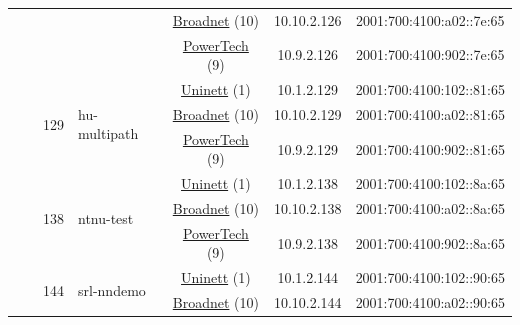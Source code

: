 \begin{small}
\begin{center}
\begin{longtable}{|c|c|c|c|c|c|c|c|}
  &  &  &  & \multicolumn{2}{|c|}{\tiny{\href{https://www.broadnet.no}{Broadnet} (10)}} & \tiny{10.10.2.126} & \tiny{2001:700:4100:a02::7e:65} \\* \cline{5-5}\cline{6-6}\cline{7-7}\cline{8-8}
  &  &  &  & \multicolumn{2}{|c|}{\tiny{\href{http://www.powertech.no}{PowerTech} (9)}} & \tiny{10.9.2.126} & \tiny{2001:700:4100:902::7e:65} \\* \cline{3-3}\cline{4-4}\cline{5-5}\cline{6-6}\cline{7-7}\cline{8-8}
  &  & \multirow{3}{*}{\tiny{129}} & \multicolumn{1}{|l|}{\multirow{3}{*}{\tiny{hu-multipath}}} & \multicolumn{2}{|c|}{\tiny{\href{https://www.uninett.no}{Uninett} (1)}} & \tiny{10.1.2.129} & \tiny{2001:700:4100:102::81:65} \\* \cline{5-5}\cline{6-6}\cline{7-7}\cline{8-8}
  &  &  &  & \multicolumn{2}{|c|}{\tiny{\href{https://www.broadnet.no}{Broadnet} (10)}} & \tiny{10.10.2.129} & \tiny{2001:700:4100:a02::81:65} \\* \cline{5-5}\cline{6-6}\cline{7-7}\cline{8-8}
  &  &  &  & \multicolumn{2}{|c|}{\tiny{\href{http://www.powertech.no}{PowerTech} (9)}} & \tiny{10.9.2.129} & \tiny{2001:700:4100:902::81:65} \\* \cline{3-3}\cline{4-4}\cline{5-5}\cline{6-6}\cline{7-7}\cline{8-8}
  &  & \multirow{3}{*}{\tiny{138}} & \multicolumn{1}{|l|}{\multirow{3}{*}{\tiny{ntnu-test}}} & \multicolumn{2}{|c|}{\tiny{\href{https://www.uninett.no}{Uninett} (1)}} & \tiny{10.1.2.138} & \tiny{2001:700:4100:102::8a:65} \\* \cline{5-5}\cline{6-6}\cline{7-7}\cline{8-8}
  &  &  &  & \multicolumn{2}{|c|}{\tiny{\href{https://www.broadnet.no}{Broadnet} (10)}} & \tiny{10.10.2.138} & \tiny{2001:700:4100:a02::8a:65} \\* \cline{5-5}\cline{6-6}\cline{7-7}\cline{8-8}
  &  &  &  & \multicolumn{2}{|c|}{\tiny{\href{http://www.powertech.no}{PowerTech} (9)}} & \tiny{10.9.2.138} & \tiny{2001:700:4100:902::8a:65} \\* \cline{3-3}\cline{4-4}\cline{5-5}\cline{6-6}\cline{7-7}\cline{8-8}
  &  & \multirow{3}{*}{\tiny{144}} & \multicolumn{1}{|l|}{\multirow{3}{*}{\tiny{srl-nndemo}}} & \multicolumn{2}{|c|}{\tiny{\href{https://www.uninett.no}{Uninett} (1)}} & \tiny{10.1.2.144} & \tiny{2001:700:4100:102::90:65} \\* \cline{5-5}\cline{6-6}\cline{7-7}\cline{8-8}
  &  &  &  & \multicolumn{2}{|c|}{\tiny{\href{https://www.broadnet.no}{Broadnet} (10)}} & \tiny{10.10.2.144} & \tiny{2001:700:4100:a02::90:65} \\* \cline{5-5}\cline{6-6}\cline{7-7}\cline{8-8}

\end{longtable}
\end{center}
\end{small}
